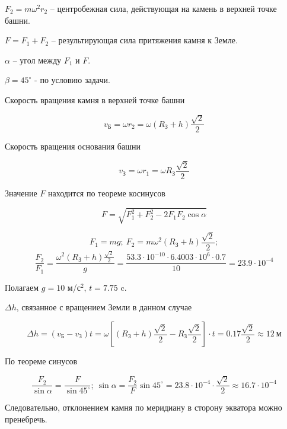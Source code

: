 $F_2=m\omega^2r_2$ – центробежная сила, действующая на камень в верхней точке башни.

$F=F_1+F_2$ – результирующая сила притяжения камня к Земле.

$\alpha$ – угол между $F_1$ и $F$.

$\beta=45^\circ$ - по условию задачи.

Скорость вращения камня в верхней точке башни 

$$v_\text{Б} = \omega r_2 = \omega (R_\text{З} + h) \frac{\sqrt{2}}{2}$$

Скорость вращения основания башни

$$v_\text{З} = \omega r_1 = \omega R_\text{З} \frac{\sqrt{2}}{2}$$

Значение $F$ находится по теореме косинусов  

$$F = \sqrt{F_1^2 + F_2^2 -2F_1F_2 \cos \alpha}$$

$$F_1 = mg; \: F_2 = m \omega^2 (R_\text{З} + h) \frac{\sqrt{2}}{2};$$
$$\frac{F_2}{F_1} = \frac{\omega^2(R_\text{З} + h) \frac{\sqrt{2}}{2}}{g} = \frac{53.3 \cdot 10^{-10} \cdot 6.4003 \cdot 10^{6} \cdot 0.7}{10} = 23.9 \cdot 10^{-4}$$
 
Полагаем $g = 10$ м/с$^2$, $t = 7.75$ c.

$\Delta h$, связанное с вращением Земли в данном случае

$$\Delta h = (v_\text{Б} - v_\text{З})t = \omega \left[ (R_\text{З} + h) \frac{\sqrt{2}}{2} - R_\text{З}\frac{\sqrt{2}}{2} \right] \cdot t = 0.17 \frac{\sqrt{2}}{2} \approx 12 \: \text{м}$$
 
По теореме синусов  

$$\frac{F_2}{\sin \alpha} = \frac{F}{\sin 45^\circ}; \: \sin \alpha = \frac{F_2}{F} \sin 45^\circ = 23.8 \cdot 10^{-4} \cdot \frac{\sqrt{2}}{2} \approx 16.7 \cdot 10^{-4}$$

Следовательно, отклонением камня по меридиану в сторону экватора можно пренебречь.
 
